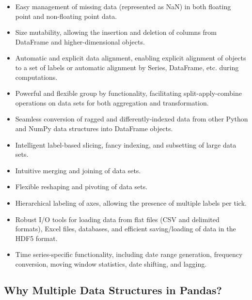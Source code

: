 	\begin{itemize}
		
		\item Easy management of missing data (represented as NaN) in both floating point and non-floating point data.
		
		\item Size mutability, allowing the insertion and deletion of columns from DataFrame and higher-dimensional objects.
		
		\item Automatic and explicit data alignment, enabling explicit alignment of objects to a set of labels or automatic alignment by Series, DataFrame, etc. during computations.
		
		\item Powerful and flexible group by functionality, facilitating split-apply-combine operations on data sets for both aggregation and transformation.
		
		\item Seamless conversion of ragged and differently-indexed data from other Python and NumPy data structures into DataFrame objects.
		
		\item Intelligent label-based slicing, fancy indexing, and subsetting of large data sets.
		
		\item Intuitive merging and joining of data sets.
		
		\item Flexible reshaping and pivoting of data sets.
		
		\item Hierarchical labeling of axes, allowing the presence of multiple labels per tick.
		
		\item Robust I/O tools for loading data from flat files (CSV and delimited formats), Excel files, databases, and efficient saving/loading of data in the HDF5 format.
		
		\item Time series-specific functionality, including date range generation, frequency conversion, moving window statistics, date shifting, and lagging.
		
	\end{itemize}

	\subsection{Why Multiple Data Structures in Pandas?}
	
